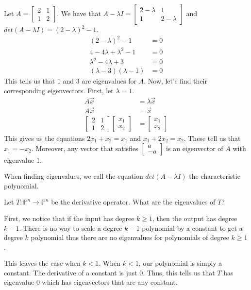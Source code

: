 \begin{example}
    Let $A=\begin{bmatrix}
        2 & 1 \\
        1 & 2
    \end{bmatrix}$. We have that $A-\lambda I=\begin{bmatrix}
        2 - \lambda & 1\\
        1 & 2 - \lambda
    \end{bmatrix}$ and $det(A-\lambda I)=(2-\lambda)^2-1$.
    \begin{align*}
        (2-\lambda)^2-1&=0\\
        4-4\lambda+\lambda^2-1&=0\\
        \lambda^2-4\lambda+3&=0\\
        (\lambda -3)(\lambda-1)&=0
    \end{align*}
    This tells us that $1$ and $3$ are eigenvalues for $A$. Now, let's find their corresponding eigenvectors. First, let $\lambda=1$.
    \begin{align*}
        A\vec{x}&=\lambda\vec{x}\\
        A\vec{x}&=\vec{x}\\
        \begin{bmatrix}
            2 & 1\\
            1 & 2
        \end{bmatrix}\begin{bmatrix}
            x_1 \\ x_2
        \end{bmatrix}&=\begin{bmatrix}
            x_1 \\ x_2
        \end{bmatrix}
    \end{align*}
    This gives us the equations $2x_1+x_2=x_1$ and $x_1+2x_2=x_2$. These tell us that $x_1=-x_2$. Moreover, any vector that satisfies $\begin{bmatrix}
        a \\ -a
    \end{bmatrix}$ is an eigenvector of $A$ with eigenvalue $1$.
\end{example}
\begin{definition}
    When finding eigenvalues, we call the equation $det(A-\lambda I)$ the characteristic polynomial.
\end{definition}
\begin{example}
    Let $T: \mathbb{P}^n\to\mathbb{P}^n$ be the derivative operator. What are the eigenvalues of $T$?

    First, we notice that if the input has degree $k\geq 1$, then the output has degree $k-1$. There is no way to scale a degree $k-1$ polynomial by a constant to get a degree $k$ polynomial thus there are no eigenvalues for polynomials of degree $k\geq 1$.

    This leaves the case when $k<1$. When $k<1$, our polynomial is simply a constant. The derivative of a constant is just $0$. Thus, this tells us that $T$ has eigenvalue $0$ which has eigenvectors that are any constant.
\end{example}
